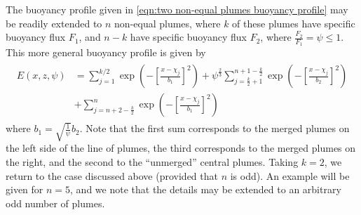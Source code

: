 \documentclass{jfm}
\begin{document}
	\noindent The buoyancy profile given in \eqref{eqn:two non-equal plumes buoyancy profile} may be readily extended to $n$ non-equal plumes, where $k$ of these plumes have specific buoyancy flux $F_1$, and $n-k$ have specific buoyancy flux $F_2$, where $\tfrac{F_2}{F_1} = \psi \leq 1$. This more general buoyancy profile is given by	
	\begin{align}
		\begin{split}
			E(x,z,\psi) &= \sum_{j=1}^{k/2}\exp\left(-\left[\frac{x - \chi_j}{b_1}\right]^2\right) + \psi^{\frac{2}{3}}\sum_{j=\frac{k}{2}+1}^{n+1-\frac{k}{2}}\exp\left(-\left[\frac{x - \chi_j}{b_2}\right]^2\right) \\
			&+\sum_{j=n+2-\frac{k}{2}}^{n}\exp\left(-\left[\frac{x - \chi_j}{b_1}\right]^2\right)
		\end{split}
	\end{align}
	where $b_1 = \sqrt{\tfrac{1}{\psi}}b_2$. Note that the first sum corresponds to the merged plumes on the left side of the line of plumes, the third corresponds to the merged plumes on the right, and the second to the ``unmerged'' central plumes. Taking $k = 2$, we return to the case discussed above (provided that $n$ is odd). An example will be given for $n = 5$, and we note that the details may be extended to an arbitrary odd number of plumes.\\
	
\end{document}
